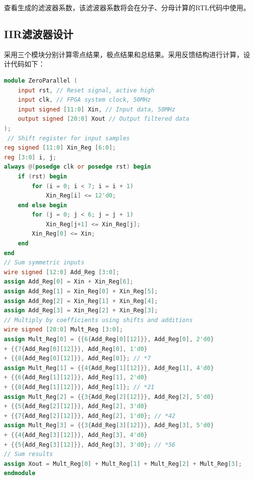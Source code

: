 查看生成的滤波器系数，该滤波器系数将会在分子、分母计算的RTL代码中使用。


\subsection{IIR滤波器设计}
采用三个模块分别计算零点结果，极点结果和总结果。采用反馈结构进行计算，设计代码如下：
\begin{lstlisting}[language=verilog,caption={零点系数部分},label=lst:zp]
module ZeroParallel (
    input rst, // Reset signal, active high
    input clk, // FPGA system clock, 50MHz
    input signed [11:0] Xin, // Input data, 50MHz
    output signed [20:0] Xout // Output filtered data
);
 // Shift register for input samples
reg signed [11:0] Xin_Reg [6:0];
reg [3:0] i, j;
always @(posedge clk or posedge rst) begin
    if (rst) begin
        for (i = 0; i < 7; i = i + 1)
            Xin_Reg[i] <= 12'd0;
    end else begin
        for (j = 0; j < 6; j = j + 1)
            Xin_Reg[j+1] <= Xin_Reg[j];
        Xin_Reg[0] <= Xin;
    end
end
// Sum symmetric inputs
wire signed [12:0] Add_Reg [3:0];
assign Add_Reg[0] = Xin + Xin_Reg[6];
assign Add_Reg[1] = Xin_Reg[0] + Xin_Reg[5];
assign Add_Reg[2] = Xin_Reg[1] + Xin_Reg[4];
assign Add_Reg[3] = Xin_Reg[2] + Xin_Reg[3];
// Multiply by coefficients using shifts and additions
wire signed [20:0] Mult_Reg [3:0];
assign Mult_Reg[0] = {{6{Add_Reg[0][12]}}, Add_Reg[0], 2'd0}
+ {{7{Add_Reg[0][12]}}, Add_Reg[0], 1'd0}
+ {{8{Add_Reg[0][12]}}, Add_Reg[0]}; // *7
assign Mult_Reg[1] = {{4{Add_Reg[1][12]}}, Add_Reg[1], 4'd0}
+ {{6{Add_Reg[1][12]}}, Add_Reg[1], 2'd0}
+ {{8{Add_Reg[1][12]}}, Add_Reg[1]}; // *21
assign Mult_Reg[2] = {{3{Add_Reg[2][12]}}, Add_Reg[2], 5'd0}
+ {{5{Add_Reg[2][12]}}, Add_Reg[2], 3'd0}
+ {{7{Add_Reg[2][12]}}, Add_Reg[2], 1'd0}; // *42
assign Mult_Reg[3] = {{3{Add_Reg[3][12]}}, Add_Reg[3], 5'd0}
+ {{4{Add_Reg[3][12]}}, Add_Reg[3], 4'd0}
+ {{5{Add_Reg[3][12]}}, Add_Reg[3], 3'd0}; // *56
// Sum results
assign Xout = Mult_Reg[0] + Mult_Reg[1] + Mult_Reg[2] + Mult_Reg[3];
endmodule
\end{lstlisting}

